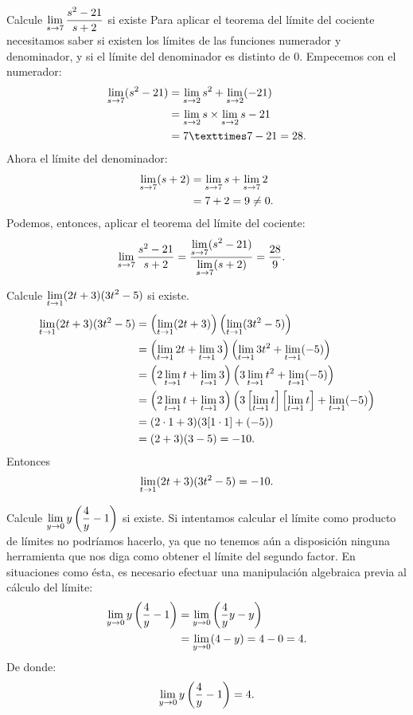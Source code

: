 \begin{exemplo}[Solución]{%
Calcule $\displaystyle\limjc{\frac{s^2 - 21}{s + 2}}{s}{7} $ si existe}%
Para aplicar el teorema del límite del cociente necesitamos saber si existen los límites de las
funciones numerador y denominador, y si el límite del denominador es distinto de $0$. Empecemos con
el numerador:
\begin{align*}
\limjc{(s^2 - 21)}{s}{7} &= \limjc{s^2}{s}{2} + \limjc{(-21)}{s}{2} \\
&= \limjc{s}{s}{2} \times \limjc{s}{s}{2} - 21 \\
&= 7 × 7 - 21 = 28.
\end{align*}
Ahora el límite del denominador:
\begin{align*}
\limjc{(s + 2)}{s}{7} &= \limjc{s}{s}{7} + \limjc{2}{s}{7}\\
  &= 7 + 2 = 9 \neq 0.
\end{align*}
Podemos, entonces, aplicar el teorema del límite del cociente:
\begin{align*}
\limjc{\frac{s^2 - 21}{s + 2}}{s}{7} &= \frac{\displaystyle\limjc{(s^2 - 21)}{s}{7}}{\displaystyle\limjc{(s + 2)}{s}{7}} = \frac{28}{9}.
\end{align*}
\end{exemplo}

\begin{exemplo}[Solución]{%
Calcule $\displaystyle\limjc{(2t + 3)(3t^2 - 5)}{t}{1}$ si existe.}%
\begin{align*}
\limjc{(2t + 3)(3t^2 - 5)}{t}{1} &= \left(\limjc{(2t + 3)}{t}{1}\right)\left(\limjc{(3t^2 -
5)}{t}{1}\right) \\
  &= \left(\limjc{2t}{t}{1} + \limjc{3}{t}{1}\right)\left(\limjc{3t^2}{t}{1} + \limjc{(-5)}{t}{1}\right)\\
  &= \left(2\limjc{t}{t}{1} + \limjc{3}{t}{1}\right)\left(3\limjc{t^2}{t}{1} + \limjc{(-5)}{t}{1}\right)\\
  &= \left(2\limjc{t}{t}{1} +
  \limjc{3}{t}{1}\right)\left(3\left[\limjc{t}{t}{1}\right]\left[\limjc{t}{t}{1}\right] +
  \limjc{(-5)}{t}{1}\right) \\
  &= (2\cdot 1 + 3)(3[1\cdot 1] + (-5)) \\
  &= (2 + 3)(3 - 5) = -10.
\end{align*}
Entonces
\[
\limjc{(2t + 3)(3t^2 - 5)}{t}{1} = -10.
\]
\end{exemplo}

\begin{exemplo}[Solución]{%
Calcule $\displaystyle\limjc{y\left(\frac{4}{y} - 1\right)}{y}{0}$ si existe.}%
Si intentamos calcular el límite como producto de límites no podríamos hacerlo, ya que no tenemos
aún a disposición ninguna herramienta que nos diga como obtener el límite del segundo factor. En
situaciones como ésta, es necesario efectuar una manipulación algebraica previa al cálculo del
límite:
\begin{align*}
\limjc{y\left(\frac{4}{y} - 1\right)}{y}{0}
  &=\limjc{\left(\frac{4}{y}y - y\right)}{y}{0}\\
  &= \limjc{(4 - y)}{y}{0} = 4 - 0 = 4.
\end{align*}
De donde:
\[
\limjc{y\left(\frac{4}{y} - 1\right)}{y}{0} = 4.
\]
\end{exemplo}


